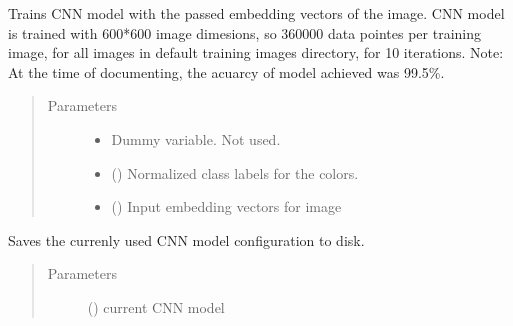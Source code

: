 \documentclass[letterpaper,10pt,english]{sphinxmanual}
\begin{document}
\begin{fulllineitems}
\label{\detokenize{basefunctions:basefunctions.regular}}
Trains CNN model with the passed embedding vectors of the image.
CNN model is trained with 600*600 image dimesions, so 360000 data pointes per training image, for all images in default training images directory, for 10 iterations.
Note: At the time of documenting, the acuarcy of model achieved was 99.5\%.
\begin{quote}\begin{description}
\item[{Parameters}] \leavevmode\begin{itemize}
\item {} 
 \textendash{} Dummy variable. Not used.

\item {} 
 () \textendash{} Normalized class labels for the colors.

\item {} 
 () \textendash{} Input embedding vectors for image

\end{itemize}

\end{description}\end{quote}

\end{fulllineitems}


\begin{fulllineitems}
\label{\detokenize{basefunctions:basefunctions.saveModelToDisk}}
Saves the currenly used CNN model configuration to disk.
\begin{quote}\begin{description}
\item[{Parameters}] \leavevmode
{} () \textendash{} current CNN model

\end{description}\end{quote}

\end{fulllineitems}
\end{document}
